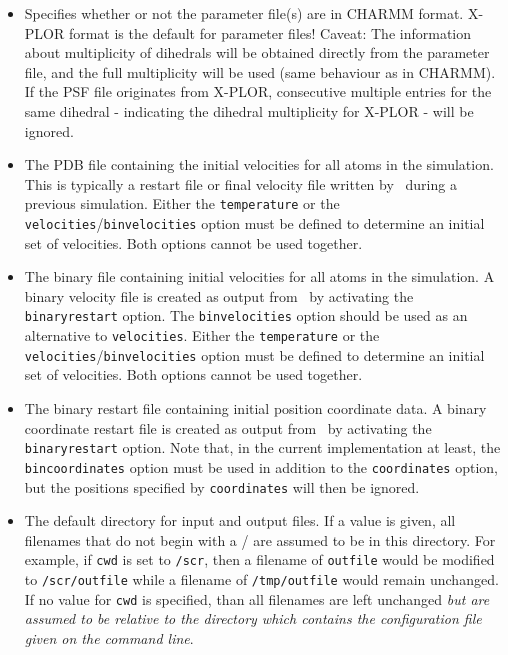 \begin{itemize}
\item
{}
{Specifies whether or not the parameter file(s) are in CHARMM format.
 X-PLOR format is the default for parameter files!
 Caveat: The information about multiplicity of dihedrals will be
 obtained directly from the parameter file, and the full multiplicity
 will be used (same behaviour as in CHARMM). If the PSF file originates
 from X-PLOR, consecutive multiple entries for the same dihedral - 
 indicating the dihedral multiplicity for X-PLOR - will be ignored.}

\item
{}
{\label{param:velocities}
The PDB file containing the initial velocities for all 
atoms in the simulation.  
This is typically a restart file or final velocity file written 
by \NAMD\ during a previous simulation.  
Either the \verb!temperature! 
or the \verb!velocities!/\verb!binvelocities! 
option must be defined to determine an initial set of velocities.  
Both options cannot be used together.}

\item
{}
{\label{param:binvelocities}
The binary file containing initial velocities for all 
atoms in the simulation.  
A binary velocity file is created as output from \NAMD\ 
by activating the \verb!binaryrestart! option.  
The \verb!binvelocities! option should be used as 
an alternative to \verb!velocities!.  
Either the \verb!temperature! 
or the \verb!velocities!/\verb!binvelocities! 
option must be defined to determine an initial set of velocities.  
Both options cannot be used together.  
}

\item
{}
{
The binary restart file containing initial position 
coordinate data.  
A binary coordinate restart file is created as output from \NAMD\ 
by activating the \verb!binaryrestart! option.  
Note that, in the current implementation at least, 
the \verb!bincoordinates! option must be used in addition 
to the \verb!coordinates! option, 
but the positions specified by \verb!coordinates! will then be ignored.  
}

\item
{}
{The default directory for input and output files.  
If a value is given, all filenames that 
do not begin with a / are assumed to be in this directory.  
For example, if \verb!cwd! is set to \verb!/scr!, then a
filename of \verb!outfile! would be modified to \verb!/scr/outfile!
while a filename of \verb!/tmp/outfile! would remain unchanged.
If no value for \verb!cwd! is specified, than all filenames are 
left unchanged {\em but are assumed to be relative to the directory
which contains the configuration file given on the command line}.}

\end{itemize}

